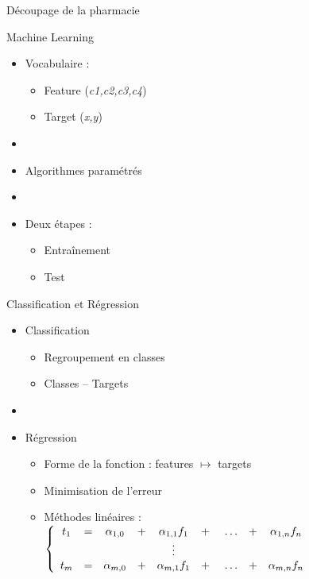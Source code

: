 \documentclass{beamer}
\begin{document}
\begin{frame}{Découpage de la pharmacie}
  \begin{center}
  \end{center}
\end{frame}

\begin{frame}{Machine Learning}
  \begin{itemize}
    \item Vocabulaire :
    \begin{itemize}
      \item Feature (\textit{c1,c2,c3,c4})
      \item Target (\textit{x,y})
    \end{itemize}
    \item[]
    \item Algorithmes paramétrés
    \item[]
    \item Deux étapes :
    \begin{itemize}
      \item Entraînement
      \item Test
    \end{itemize}
  \end{itemize}
\end{frame}

\begin{frame}{Classification et Régression}
  \begin{itemize}
    \item Classification
    \begin{itemize}
      \item Regroupement en classes
      \item Classes -- Targets
    \end{itemize}
    \item[]
    \item Régression
    \begin{itemize}
      \item Forme de la fonction : features $\mapsto$ targets
      \item Minimisation de l'erreur
      \item Méthodes linéaires :
      \begin{math}
        \left\{
        \begin{array}{c c c c c cccc}
          t_1 &=& \alpha_{1,0} &+& \alpha_{1,1}f_1 &+& \dots &+& \alpha_{1,n}f_n\\
          &&&&\vdots\\
          t_m &=& \alpha_{m,0} &+& \alpha_{m,1}f_1 &+& \dots &+& \alpha_{m,n}f_n
        \end{array}
        \right.
      \end{math}
    \end{itemize}
  \end{itemize}
\end{frame}
\end{document}
